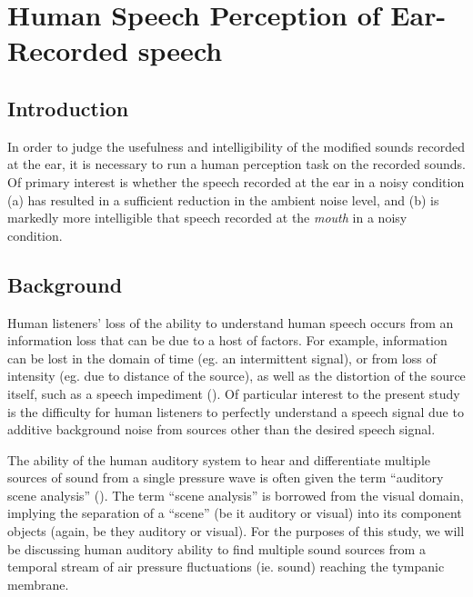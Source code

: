 \documentclass[dissertation,copyright]{uathesis}
\begin{document}


 



\chapter{Human Speech Perception of Ear-Recorded speech\label{chapter4}}


\section{Introduction}

In order to judge the usefulness and intelligibility of the modified sounds recorded at the ear, it is necessary to run a human perception task on the recorded sounds.  Of primary interest is whether the speech recorded at the ear in a noisy condition (a) has resulted in a sufficient reduction in the ambient noise level, and (b) is markedly more intelligible that speech recorded at the \textit{mouth} in a noisy condition.

\section{Background}

Human listeners' loss of the ability to understand human speech occurs from an information loss that can be due to a host of factors.  For example, information can be lost in the domain of time (eg. an intermittent signal), or from loss of intensity (eg. due to distance of the source), as well as the distortion of the source itself, such as a speech impediment (\cite{mattys:12}).  Of particular interest to the present study is the difficulty for human listeners to perfectly understand a speech signal due to additive background noise from sources other than the desired speech signal.

The ability of the human auditory system to hear and differentiate multiple sources of sound from a single pressure wave is often given the term ``auditory scene analysis'' (\cite{bregman:94}).  The term ``scene analysis'' is borrowed from the visual domain, implying the separation of a ``scene'' (be it auditory or visual) into its component objects (again, be they auditory or visual). For the purposes of this study, we will be discussing human auditory ability to find multiple sound sources from a temporal stream of air pressure fluctuations (ie. sound) reaching the tympanic membrane.
\end{document}
